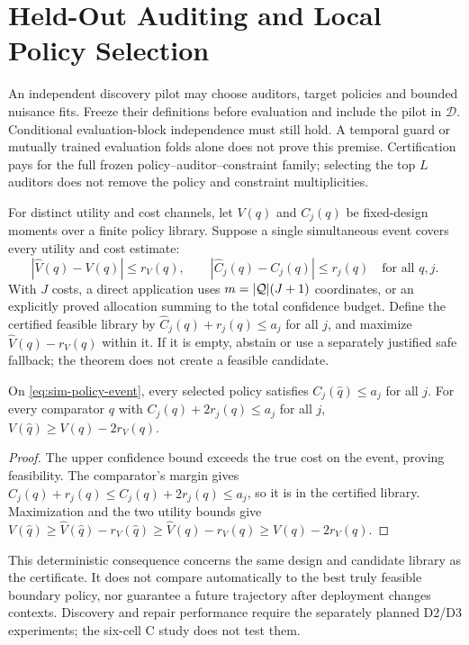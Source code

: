 \section{Held-Out Auditing and Local Policy Selection}
\label{sec:discover-repair}
An independent discovery pilot may choose auditors, target policies and bounded nuisance fits. Freeze their definitions before evaluation and include the pilot in $\mathcal D$. Conditional evaluation-block independence must still hold. A temporal guard or mutually trained evaluation folds alone does not prove this premise. Certification pays for the full frozen policy--auditor--constraint family; selecting the top $L$ auditors does not remove the policy and constraint multiplicities.

For distinct utility and cost channels, let $V(q)$ and $C_j(q)$ be fixed-design moments over a finite policy library. Suppose a single simultaneous event covers every utility and cost estimate:
\begin{equation}
 |\widehat V(q)-V(q)|\le r_V(q),\qquad
 |\widehat C_j(q)-C_j(q)|\le r_j(q)\quad\text{for all }q,j.
 \label{eq:sim-policy-event}
\end{equation}
With $J$ costs, a direct application uses $m=|\mathcal{Q}|(J+1)$ coordinates, or an explicitly proved allocation summing to the total confidence budget. Define the certified feasible library by $\widehat C_j(q)+r_j(q)\le a_j$ for all $j$, and maximize $\widehat V(q)-r_V(q)$ within it. If it is empty, abstain or use a separately justified safe fallback; the theorem does not create a feasible candidate.

\begin{proposition}
\label{prop:repair}
On \eqref{eq:sim-policy-event}, every selected policy satisfies $C_j(\widehat q)\le a_j$ for all $j$. For every comparator $q$ with $C_j(q)+2r_j(q)\le a_j$ for all $j$,
$V(\widehat q)\ge V(q)-2r_V(q)$.
\end{proposition}
\begin{proof}
The upper confidence bound exceeds the true cost on the event, proving feasibility. The comparator's margin gives $\widehat C_j(q)+r_j(q)\le C_j(q)+2r_j(q)\le a_j$, so it is in the certified library. Maximization and the two utility bounds give
$V(\widehat q)\ge\widehat V(\widehat q)-r_V(\widehat q)\ge\widehat V(q)-r_V(q)\ge V(q)-2r_V(q)$.
\end{proof}
This deterministic consequence concerns the same design and candidate library as the certificate. It does not compare automatically to the best truly feasible boundary policy, nor guarantee a future trajectory after deployment changes contexts. Discovery and repair performance require the separately planned D2/D3 experiments; the six-cell C study does not test them.
